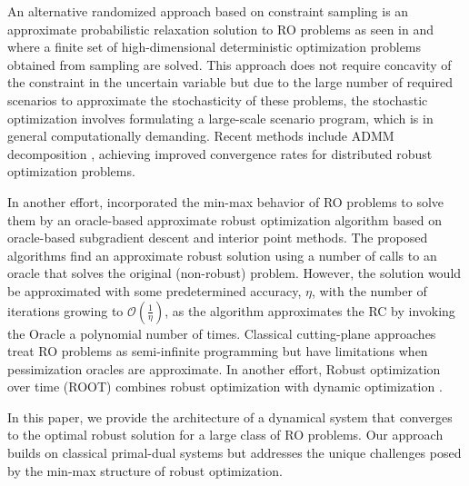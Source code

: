 \documentclass[journal,twoside,web]{ieeecolor}
\newcommand{\rev}[1]{\textcolor{revisionblue}{#1}}
\begin{document}
An alternative randomized approach based on constraint sampling is an approximate probabilistic relaxation solution to RO problems as seen in \cite{calafiore2004} and \cite{calafiore2010} where a finite set of high-dimensional deterministic optimization problems obtained from sampling are solved. This approach does not require concavity of the constraint in the uncertain variable but due to the large number of required scenarios to approximate the stochasticity of these problems, the stochastic optimization involves formulating a large-scale scenario program, which is in general computationally demanding.
\rev{Recent methods include ADMM decomposition \cite{rostampour2021}, achieving improved convergence rates for distributed robust optimization problems.}

In another effort, \cite{bental2015} incorporated the min-max behavior of RO problems to solve them by an oracle-based approximate robust optimization algorithm based on oracle-based subgradient descent and interior point methods. The proposed algorithms find an approximate robust solution using a number of calls to an oracle that solves the original (non-robust) problem. However, the solution would be approximated with some predetermined accuracy, $\eta$, with the number of iterations growing to $\mathcal{O}(\frac{1}{\eta})$, as the algorithm approximates the RC by invoking the Oracle a polynomial number of times.
\rev{Classical cutting-plane approaches \cite{mutapcic2009} treat RO problems as semi-infinite programming but have limitations when pessimization oracles are approximate.} In another effort, \rev{Robust optimization over time (ROOT) combines robust optimization with dynamic optimization \cite{yazdani2023,aigner2023}.}

In this paper, we provide the architecture of a dynamical system that converges to the optimal robust solution for a large class of RO problems. Our approach builds on classical primal-dual systems \cite{arrow1958,feijer2010} but addresses the unique challenges posed by the min-max structure of robust optimization.
\end{document}
